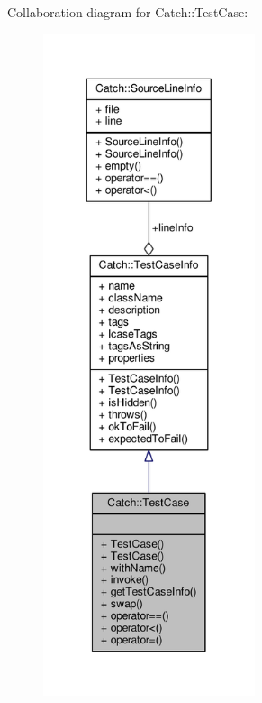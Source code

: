 Collaboration diagram for Catch\-:\-:Test\-Case\-:
\nopagebreak
\begin{figure}[H]
\begin{center}
\leavevmode
\includegraphics[height=550pt]{class_catch_1_1_test_case__coll__graph}
\end{center}
\end{figure}
